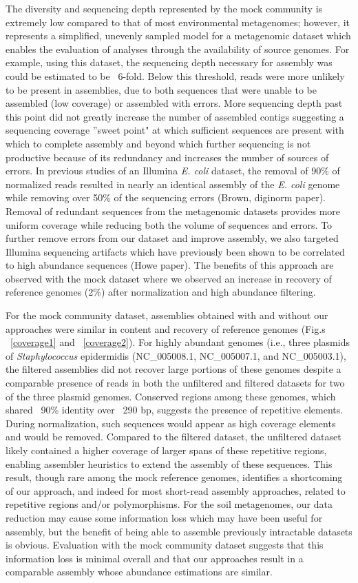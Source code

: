 \documentclass[11pt]{article} %
\begin{document}
The diversity and sequencing depth represented by the mock community is extremely low compared to that of most environmental metagenomes; however, it represents a simplified, unevenly sampled model for a metagenomic dataset which enables the evaluation of analyses through the availability of source genomes.  For example, using this dataset, the sequencing depth necessary for assembly was could be estimated to be ~6-fold.  Below this threshold, reads were more unlikely to be present in assemblies, due to both sequences that were unable to be assembled (low coverage) or assembled with errors.  More sequencing depth past this point did not greatly increase the number of assembled contigs suggesting a sequencing coverage ''sweet point" at which sufficient sequences are present with which to complete assembly and beyond which further sequencing is not productive because of its redundancy and increases the number of sources of errors.  In previous studies of an Illumina \emph{E. coli} dataset, the removal of 90\% of normalized reads resulted in nearly an identical assembly of the \emph{E. coli} genome while removing over 50\% of the sequencing errors (Brown, diginorm paper).  Removal of redundant sequences from the metagenomic datasets provides more uniform coverage while reducing both the volume of sequences and errors.  To further remove errors from our dataset and improve assembly, we also targeted Illumina sequencing artifacts which have previously been shown to be correlated to high abundance sequences (Howe paper).  The benefits of this approach are observed with the mock dataset where we observed an increase in recovery of reference genomes (2\%) after normalization and high abundance filtering.

For the mock community dataset, assemblies obtained with and without our approaches were similar in content and recovery of reference genomes (Fig.s ~\ref{coverage1} and ~\ref{coverage2}).  For highly abundant genomes (i.e., three plasmids of \emph{Staphylococcus} epidermidis (NC\_005008.1, NC\_005007.1, and NC\_005003.1), the filtered assemblies did not recover large portions of these genomes despite a comparable presence of reads in both the unfiltered and filtered datasets for two of the three plasmid genomes.  Conserved regions among these genomes, which shared ~90\% identity over ~290 bp, suggests the presence of repetitive elements.  During normalization, such sequences would appear as high coverage elements and would be removed.   Compared to the filtered dataset, the unfiltered dataset likely contained a higher coverage of larger spans of these repetitive regions, enabling assembler heuristics to extend the assembly of these sequences.  This result, though rare among the mock reference genomes, identifies a shortcoming of our approach, and indeed for most short-read assembly approaches, related to repetitive regions and/or polymorphisms.  For the soil metagenomes, our data reduction may cause some information loss which may have been useful for assembly, but the benefit of being able to assemble previously intractable datasets is obvious.  Evaluation with the mock community dataset suggests that this information loss is minimal overall and that our approaches result in a comparable assembly whose abundance estimations are similar.   
\end{document}
